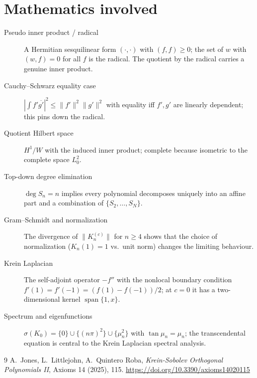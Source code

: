 ﻿\documentclass[11pt]{article}
\begin{document}
\section{Mathematics involved}

\begin{description}
	\item[Pseudo inner product / radical] A Hermitian sesquilinear form
	$(\cdot,\cdot)$ with $(f,f)\ge0$; the set of $w$ with
	$(w,f)=0$ for all $f$ is the radical.  The quotient by the radical
	carries a genuine inner product.
	\item[Cauchy--Schwarz equality case] $|\int f'\overline{g'}|^2\le
	\|f'\|^2\|g'\|^2$ with equality iff $f',g'$ are linearly dependent; this pins
	down the radical.
	\item[Quotient Hilbert space] $H^1/W$ with the induced inner product;
	complete because isometric to the complete space $L^2_0$.
	\item[Top-down degree elimination] $\deg S_n=n$ implies every
	polynomial decomposes uniquely into an affine part and a combination of
	$\{S_2,\ldots,S_N\}$.
	\item[Gram--Schmidt and normalization] The divergence of
	$\|K_n^{(c)}\|$ for $n\ge4$ shows that the choice of normalization
	($K_n(1)=1$ vs.\ unit norm) changes the limiting behaviour.
	\item[Krein Laplacian] The self-adjoint operator $-f''$ with the
	nonlocal boundary condition $f'(1)=f'(-1)=(f(1)-f(-1))/2$; at $c=0$ it
	has a two-dimensional kernel $\operatorname{span}\{1,x\}$.
	\item[Spectrum and eigenfunctions] $\sigma(K_0)=\{0\}\cup\{(n\pi)^2\}
	\cup\{\mu_n^2\}$ with $\tan\mu_n=\mu_n$; the transcendental equation is
	central to the Krein Laplacian spectral analysis.
\end{description}

\begin{thebibliography}{9}
 A.~Jones, L.~Littlejohn, A.~Quintero Roba,
	\emph{Krein-Sobolev Orthogonal Polynomials II}, Axioms 14 (2025), 115.
	\url{https://doi.org/10.3390/axioms14020115}
\end{thebibliography}
\end{document}
